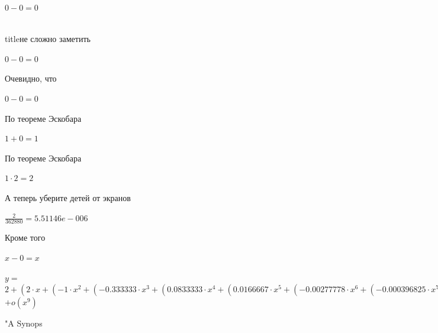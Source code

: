 \documentclass[12pt,a4paper,fleqn]{article}
\begin{document}
\begin{center}
\begin{center}
\begin{center}
\begin{center}
\begin{center}
\begin{center}
\begin{center}
\begin{center}
\begin{center}
\begin{center}
\begin{center}
\begin{center}
\begin{center}
\begin{center}
\begin{center}
\begin{center}
\begin{center}
\begin{center}
\begin{center}
\begin{center}
\begin{center}
\begin{center}
\begin{center}
\begin{center}
\begin{center}
\begin{center}
\begin{center}
\begin{center}
\begin{center}
\begin{center}
\begin{center}
\begin{center}
\begin{center}
\begin{center}
\begin{center}
\begin{center}
\begin{center}
\begin{center}
\begin{center}
\begin{center}
\begin{center}
\begin{center}
\begin{center}
\begin{center}
\begin{center}
\begin{center}
\begin{center}
\begin{center}
\begin{center}
\begin{center}
\begin{center}
\begin{center}
\begin{center}
\begin{center}
\begin{center}
\begin{center}
\begin{center}
\begin{center}
\begin{center}
\begin{center}
\begin{center}
\begin{center}
\begin{center}
\begin{center}
\begin{center}
\begin{center}
\begin{center}
\begin{center}
\begin{center}
\begin{center}
\begin{center}
\begin{center}
\begin{center}
\begin{center}
\begin{center}
\begin{center}
\begin{center}
\begin{center}
\begin{center}
\begin{center}
\begin{center}
\begin{center}
\begin{center}
\begin{center}
\begin{center}
\begin{center}
\begin{center}
\begin{center}
\begin{center}
\begin{center}$0-0 = 0$\end{center}
\\ title{не сложно заметить} 

\begin{center}
\begin{center}$0-0 = 0$\end{center}
Очевидно, что

\begin{center}
\begin{center}$0-0 = 0$\end{center}
По теореме Эскобара

\begin{center}
\begin{center}$1+0 = 1$\end{center}
По теореме Эскобара

\begin{center}
\begin{center}$1 \cdot 2 = 2$\end{center}
А теперь уберите детей от экранов

\begin{center}
\begin{center}$\frac{2}{362880} = 5.51146e-006$\end{center}
Кроме того

\begin{center}
$x-0 = x$\end{center}
\begin{center}
$y = $$2+(2 \cdot x+(-1 \cdot x^{2}+(-0.333333 \cdot x^{3}+(0.0833333 \cdot x^{4}+(0.0166667 \cdot x^{5}+(-0.00277778 \cdot x^{6}+(-0.000396825 \cdot x^{7}+(4.96032e-005 \cdot x^{8}+5.51146e-006 \cdot x^{9}))))))))$$ + o(x^{9})$
\end{center}
\newpage\begin{thebibliography}{}
  "A Synops
\end{thebibliography}
\end{center}
\end{center}
\end{center}
\end{center}
\end{center}
\end{center}
\end{center}
\end{center}
\end{center}
\end{center}
\end{center}
\end{center}
\end{center}
\end{center}
\end{center}
\end{center}
\end{center}
\end{center}
\end{center}
\end{center}
\end{center}
\end{center}
\end{center}
\end{center}
\end{center}
\end{center}
\end{center}
\end{center}
\end{center}
\end{center}
\end{center}
\end{center}
\end{center}
\end{center}
\end{center}
\end{center}
\end{center}
\end{center}
\end{center}
\end{center}
\end{center}
\end{center}
\end{center}
\end{center}
\end{center}
\end{center}
\end{center}
\end{center}
\end{center}
\end{center}
\end{center}
\end{center}
\end{center}
\end{center}
\end{center}
\end{center}
\end{center}
\end{center}
\end{center}
\end{center}
\end{center}
\end{center}
\end{center}
\end{center}
\end{center}
\end{center}
\end{center}
\end{center}
\end{center}
\end{center}
\end{center}
\end{center}
\end{center}
\end{center}
\end{center}
\end{center}
\end{center}
\end{center}
\end{center}
\end{center}
\end{center}
\end{center}
\end{center}
\end{center}
\end{center}
\end{center}
\end{center}
\end{center}
\end{center}
\end{center}
\end{center}
\end{center}
\end{center}
\end{center}
\end{document}
